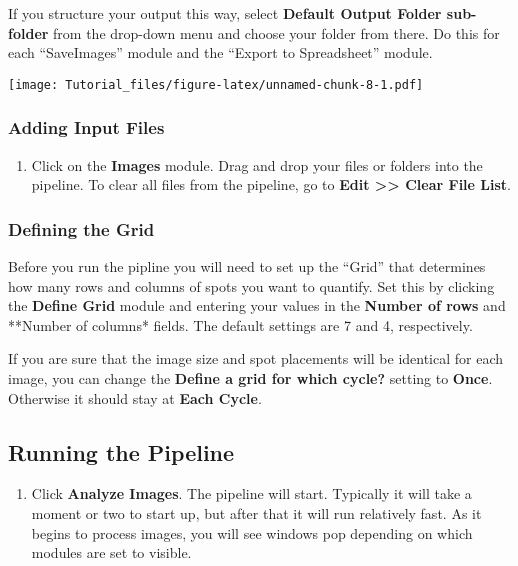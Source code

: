 \documentclass[
]{article}
\providecommand{\tightlist}{%
  \setlength{\itemsep}{0pt}\setlength{\parskip}{0pt}}
\begin{document}
If you structure your output this way, select \textbf{Default Output
Folder sub-folder} from the drop-down menu and choose your folder from
there. Do this for each ``SaveImages'' module and the ``Export to
Spreadsheet'' module.

\texttt{[image: Tutorial\_files/figure-latex/unnamed-chunk-8-1.pdf]}

\hypertarget{adding-input-files}{%
\subsubsection{Adding Input Files}\label{adding-input-files}}

\begin{enumerate}
\def\labelenumi{\arabic{enumi}.}
\tightlist
\item
  Click on the \textbf{Images} module. Drag and drop your files or
  folders into the pipeline. To clear all files from the pipeline, go to
  \textbf{Edit \textgreater\textgreater{} Clear File List}.
\end{enumerate}

\hypertarget{defining-the-grid}{%
\subsubsection{Defining the Grid}\label{defining-the-grid}}

Before you run the pipline you will need to set up the ``Grid'' that
determines how many rows and columns of spots you want to quantify. Set
this by clicking the \textbf{Define Grid} module and entering your
values in the \textbf{Number of rows} and **Number of columns* fields.
The default settings are 7 and 4, respectively.

If you are sure that the image size and spot placements will be
identical for each image, you can change the \textbf{Define a grid for
which cycle?} setting to \textbf{Once}. Otherwise it should stay at
\textbf{Each Cycle}.

\hypertarget{running-the-pipeline}{%
\subsection{Running the Pipeline}\label{running-the-pipeline}}

\begin{enumerate}
\def\labelenumi{\arabic{enumi}.}
\tightlist
\item
  Click \textbf{Analyze Images}. The pipeline will start. Typically it
  will take a moment or two to start up, but after that it will run
  relatively fast. As it begins to process images, you will see windows
  pop depending on which modules are set to visible.
\end{enumerate}
\end{document}
